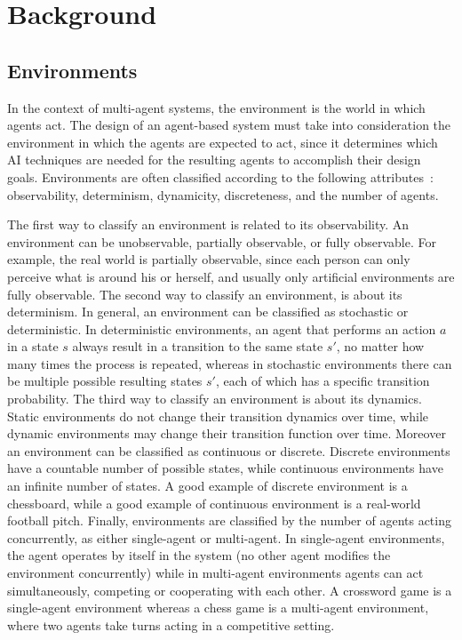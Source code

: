 \chapter{Background}
\label{chapter:background}



\section{Environments}
\label{sec:environments}

In the context of multi-agent systems, the environment is the world in which agents act.
The design of an agent-based system must take into consideration the environment in which the agents are expected to act, since it determines which AI techniques are needed for the resulting agents to accomplish their design goals. 
Environments are often classified according to the following attributes~\cite{russell1995artificial}:  observability, determinism, dynamicity, discreteness, and the number of agents. 

The first way to classify an environment is related to its observability. 
An environment can be unobservable, partially observable, or fully observable. 
For example, the real world is partially observable, since each person can only perceive what is around his or herself, and usually only artificial environments are fully observable.
% 
The second way to classify an environment, is about its determinism.
In general, an environment can be classified as stochastic or deterministic.
In deterministic environments, an agent that performs an action $a$ in a state $s$ always result in a transition to the same state $s'$, no matter how many times the process is repeated, whereas in stochastic environments there can be multiple possible resulting states $s'$, each of which has a specific transition probability.
% 
The third way to classify an environment is about its dynamics. 
Static environments do not change their transition dynamics over time, while dynamic environments may change their transition function over time. 
% 
Moreover an environment can be classified as continuous or discrete.
Discrete environments have a countable number of possible states, while continuous environments have an infinite number of states.
A good example of discrete environment is a chessboard, while a good example of continuous environment is a real-world football pitch. 
% 
Finally, environments are classified by the number of agents acting concurrently, as either single-agent or multi-agent. 
In single-agent environments, the agent operates by itself in the system (no other agent modifies the environment concurrently) while in multi-agent environments agents can act simultaneously, competing or cooperating with each other. 
A crossword game is a single-agent environment whereas a chess game is a multi-agent environment, where  two agents take turns acting in a competitive setting.



